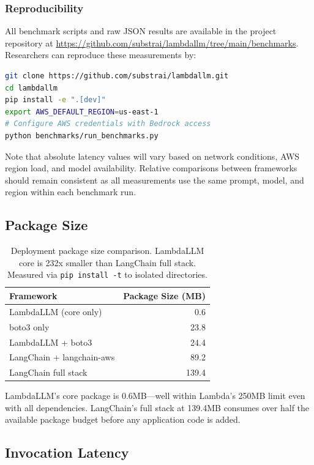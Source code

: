 \documentclass[11pt,a4paper]{article}
\begin{document}
\subsubsection{Reproducibility}

All benchmark scripts and raw JSON results are available in the project repository at \url{https://github.com/substrai/lambdallm/tree/main/benchmarks}. Researchers can reproduce these measurements by:

\begin{lstlisting}[language=bash]
git clone https://github.com/substrai/lambdallm.git
cd lambdallm
pip install -e ".[dev]"
export AWS_DEFAULT_REGION=us-east-1
# Configure AWS credentials with Bedrock access
python benchmarks/run_benchmarks.py
\end{lstlisting}

Note that absolute latency values will vary based on network conditions, AWS region load, and model availability. Relative comparisons between frameworks should remain consistent as all measurements use the same prompt, model, and region within each benchmark run.


\subsection{Package Size}

\begin{table}[h]
\centering
\begin{tabular}{lr}
\toprule
\textbf{Framework} & \textbf{Package Size (MB)} \\
\midrule
LambdaLLM (core only) & 0.6 \\
boto3 only & 23.8 \\
LambdaLLM + boto3 & 24.4 \\
LangChain + langchain-aws & 89.2 \\
LangChain full stack & 139.4 \\
\bottomrule
\end{tabular}
\caption{Deployment package size comparison. LambdaLLM core is 232x smaller than LangChain full stack. Measured via \texttt{pip install -t} to isolated directories.}
\end{table}

LambdaLLM's core package is 0.6MB---well within Lambda's 250MB limit even with all dependencies. LangChain's full stack at 139.4MB consumes over half the available package budget before any application code is added.

\subsection{Invocation Latency}
\end{document}
